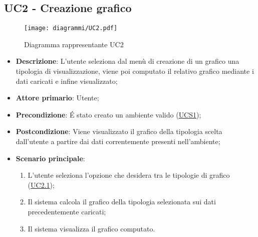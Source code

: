 \subsection{UC2 - Creazione grafico}
\label{sub:uc2}

\begin{figure}[h]
    \centering
    \texttt{[image: diagrammi/UC2.pdf]}
    \caption{Diagramma rappresentante UC2}
    \label{fig:UC2}
\end{figure}


\begin{itemize}
	\item \textbf{Descrizione}: L’utente seleziona dal menù di creazione di un grafico una tipologia di 
	visualizzazione, viene poi computato il relativo grafico mediante i dati caricati e infine visualizzato;
	
    \item \textbf{Attore primario}: Utente;
    
    \item \textbf{Precondizione}:   É stato creato un ambiente valido (\hyperref[sub:uc1]{UCS1});

	\item \textbf{Postcondizione}:  Viene visualizzato il grafico della tipologia scelta dall'utente a partire dai dati 
	correntemente presenti nell'ambiente; 

	\item \textbf{Scenario principale}:
		\begin{enumerate}
			\item L'utente seleziona l'opzione che desidera tra le tipologie di grafico (\hyperref[ssub:uc2.1]{UC2.1});
			\item Il sistema calcola il grafico della tipologia selezionata sui dati precedentemente caricati;
			\item Il sistema visualizza il grafico computato.
		\end{enumerate}
\end{itemize}

